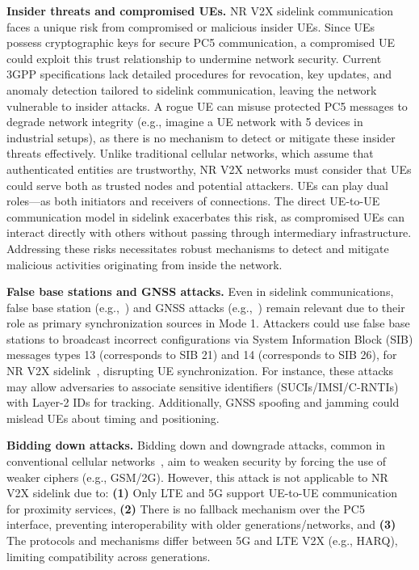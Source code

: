 \textbf{Insider threats and compromised UEs.} NR V2X sidelink communication faces a unique risk from compromised or malicious insider UEs. Since UEs possess cryptographic keys for secure PC5 communication, a compromised UE could exploit this trust relationship to undermine network security. Current 3GPP specifications lack detailed procedures for revocation, key updates, and anomaly detection tailored to sidelink communication, leaving the network vulnerable to insider attacks. A rogue UE can misuse protected PC5 messages to degrade network integrity (e.g., imagine a UE network with 5 devices in industrial setups), as there is no mechanism to detect or mitigate these insider threats effectively. Unlike traditional cellular networks, which assume that authenticated entities are trustworthy, NR V2X networks must consider that UEs could serve both as trusted nodes and potential attackers. UEs can play dual roles—as both initiators and receivers of connections. The direct UE-to-UE communication model in sidelink exacerbates this risk, as compromised UEs can interact directly with others without passing through intermediary infrastructure. Addressing these risks necessitates robust mechanisms to detect and mitigate malicious activities originating from inside the network.

\textbf{False base stations and GNSS attacks.} 
Even in sidelink communications, false base station (e.g.,~\cite{bitsikas21handovers}) and GNSS attacks (e.g.,~\cite{Zidan21:GNSS}) remain relevant due to their role as primary synchronization sources in Mode 1. Attackers could use false base stations to broadcast incorrect configurations via System Information Block (SIB) messages types 13 (corresponds to SIB 21) and 14 (corresponds to SIB 26), for NR V2X sidelink~\cite{3gpp.38.331}, disrupting UE synchronization. For instance, these attacks may allow adversaries to associate sensitive identifiers (SUCIs/IMSI/C-RNTIs) with Layer-2 IDs for tracking. Additionally, GNSS spoofing and jamming could mislead UEs about timing and positioning.

\textbf{Bidding down attacks.} Bidding down and downgrade attacks, common in conventional cellular networks~\cite{Karakoc23:Bidding}, aim to weaken security by forcing the use of weaker ciphers (e.g., GSM/2G). However, this attack is not applicable to NR V2X sidelink due to: \textbf{(1)} Only LTE and 5G support UE-to-UE communication for proximity services, \textbf{(2)} There is no fallback mechanism over the PC5 interface, preventing interoperability with older generations/networks, and \textbf{(3)} The protocols and mechanisms differ between 5G and LTE V2X (e.g., HARQ), limiting compatibility across generations.

